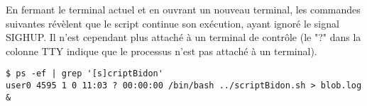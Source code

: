 En fermant le terminal actuel et en ouvrant un nouveau terminal, les commandes suivantes révèlent que le script continue son exécution, ayant ignoré le signal SIGHUP. Il n'est cependant
plus attaché à un terminal de contrôle (le "?" dans la colonne TTY indique que le processus n'est pas attaché à un terminal).

\begin{lstlisting}
$ ps -ef | grep '[s]criptBidon'
user0 4595 1 0 11:03 ? 00:00:00 /bin/bash ../scriptBidon.sh > blob.log &
\end{lstlisting}
